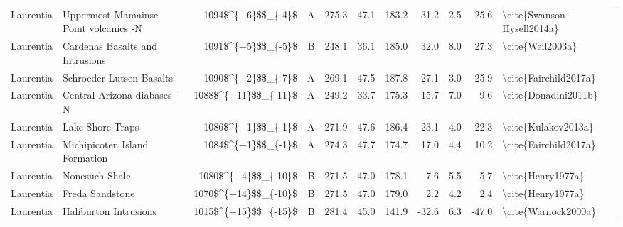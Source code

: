 \begin{longtable}{p{1 in}p{1 in}rrrrrrrr}
                     Laurentia &            Uppermost Mamainse Point volcanics -N &     1094\$\textasciicircum \{+6\}\$\$\_\{-4\}\$ &      A &     275.3 &      47.1 & 183.2 &  31.2 &       2.5 &        25.6 &                         \textbackslash cite\{Swanson-Hysell2014a\} \\
                     Laurentia &                  Cardenas Basalts and Intrusions &     1091\$\textasciicircum \{+5\}\$\$\_\{-5\}\$ &      B &     248.1 &      36.1 & 185.0 &  32.0 &       8.0 &        27.3 &                                   \textbackslash cite\{Weil2003a\} \\
                     Laurentia &                         Schroeder Lutsen Basalts &     1090\$\textasciicircum \{+2\}\$\$\_\{-7\}\$ &      A &     269.1 &      47.5 & 187.8 &  27.1 &       3.0 &        25.9 &                              \textbackslash cite\{Fairchild2017a\} \\
                     Laurentia &                      Central Arizona diabases -N &   1088\$\textasciicircum \{+11\}\$\$\_\{-11\}\$ &      A &     249.2 &      33.7 & 175.3 &  15.7 &       7.0 &         9.6 &                               \textbackslash cite\{Donadini2011b\} \\
                     Laurentia &                                 Lake Shore Traps &     1086\$\textasciicircum \{+1\}\$\$\_\{-1\}\$ &      A &     271.9 &      47.6 & 186.4 &  23.1 &       4.0 &        22.3 &                                \textbackslash cite\{Kulakov2013a\} \\
                     Laurentia &                    Michipicoten Island Formation &     1084\$\textasciicircum \{+1\}\$\$\_\{-1\}\$ &      A &     274.3 &      47.7 & 174.7 &  17.0 &       4.4 &        10.2 &                              \textbackslash cite\{Fairchild2017a\} \\
                     Laurentia &                                   Nonesuch Shale &    1080\$\textasciicircum \{+4\}\$\$\_\{-10\}\$ &      B &     271.5 &      47.0 & 178.1 &   7.6 &       5.5 &         5.7 &                                  \textbackslash cite\{Henry1977a\} \\
                     Laurentia &                                  Freda Sandstone &   1070\$\textasciicircum \{+14\}\$\$\_\{-10\}\$ &      B &     271.5 &      47.0 & 179.0 &   2.2 &       4.2 &         2.4 &                                  \textbackslash cite\{Henry1977a\} \\
                     Laurentia &                            Haliburton Intrusions &   1015\$\textasciicircum \{+15\}\$\$\_\{-15\}\$ &      B &     281.4 &      45.0 & 141.9 & -32.6 &       6.3 &       -47.0 &                                \textbackslash cite\{Warnock2000a\} \\

\end{longtable}
